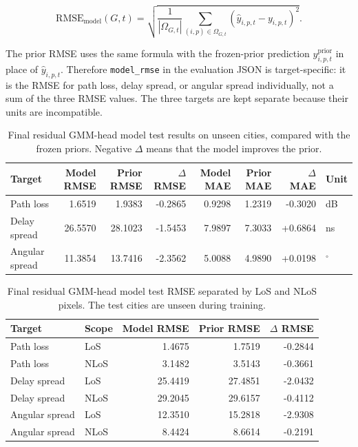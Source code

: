 \begin{equation}
  \mathrm{RMSE}_{\mathrm{model}}(G,t) =
  \sqrt{\frac{1}{|\Omega_{G,t}|}
  \sum_{(i,p)\in\Omega_{G,t}}
  \left(\hat{y}_{i,p,t} - y_{i,p,t}\right)^2}.
  \label{eq:try80_model_rmse}
\end{equation}

The prior RMSE uses the same formula with the frozen-prior prediction
\(y^{\mathrm{prior}}_{i,p,t}\) in place of \(\hat{y}_{i,p,t}\). Therefore
\texttt{model\_rmse} in the evaluation JSON is target-specific: it is the RMSE
for path loss, delay spread, or angular spread individually, not a sum of the
three RMSE values. The three targets are kept separate because their units are
incompatible.

\begin{table}[H]
\centering
\caption[Final residual GMM-head model test results on unseen cities.]
{Final residual GMM-head model test results on unseen cities, compared with the frozen
priors. Negative \(\Delta\) means that the model improves the prior.}
\label{tab:try80_final_test_overall}
\scriptsize
\begin{tabular}{lrrrrrrl}
\toprule
Target & Model RMSE & Prior RMSE & \(\Delta\) RMSE & Model MAE & Prior MAE & \(\Delta\) MAE & Unit \\
\midrule
Path loss & 1.6519 & 1.9383 & -0.2865 & 0.9298 & 1.2319 & -0.3020 & dB \\
Delay spread & 26.5570 & 28.1023 & -1.5453 & 7.9897 & 7.3033 & +0.6864 & ns \\
Angular spread & 11.3854 & 13.7416 & -2.3562 & 5.0088 & 4.9890 & +0.0198 & \(^{\circ}\) \\
\bottomrule
\end{tabular}
\end{table}

\begin{table}[H]
\centering
\caption{Final residual GMM-head model test RMSE separated by LoS and NLoS pixels. The test
cities are unseen during training.}
\label{tab:try80_final_test_los_nlos}
\scriptsize
\begin{tabular}{llrrr}
\toprule
Target & Scope & Model RMSE & Prior RMSE & \(\Delta\) RMSE \\
\midrule
Path loss & LoS & 1.4675 & 1.7519 & -0.2844 \\
Path loss & NLoS & 3.1482 & 3.5143 & -0.3661 \\
Delay spread & LoS & 25.4419 & 27.4851 & -2.0432 \\
Delay spread & NLoS & 29.2045 & 29.6157 & -0.4112 \\
Angular spread & LoS & 12.3510 & 15.2818 & -2.9308 \\
Angular spread & NLoS & 8.4424 & 8.6614 & -0.2191 \\
\bottomrule
\end{tabular}
\end{table}

